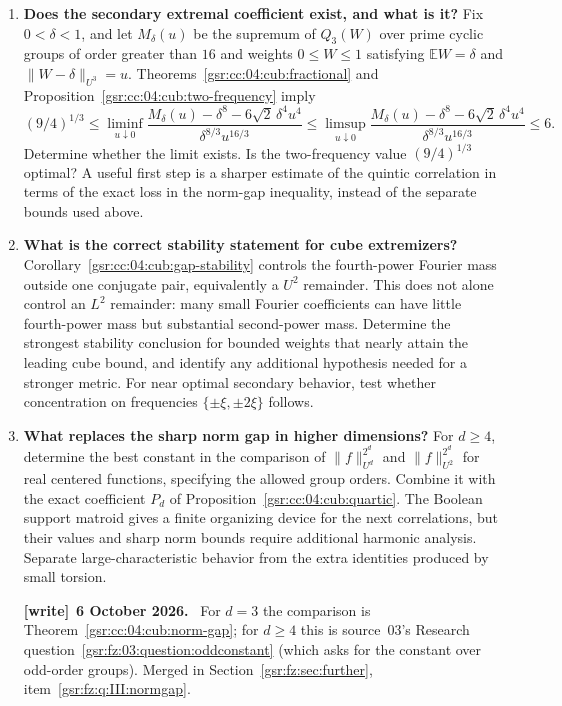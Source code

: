 \documentclass[11pt,letterpaper]{article}
\numberwithin{equation}{section}
\theoremstyle{definition}
\theoremstyle{remark}
\newcommand{\E}{\mathbb E}
\newcommand{\1}{\mathbf 1}
\newenvironment{writenote}[1][]{\par\smallskip\begingroup\small
 \noindent\textbf{[write]}\if\relax\detokenize{#1}\relax\else~\textbf{#1.}\fi\ }%
 {\par\endgroup\smallskip}
\begin{document}
\begin{enumerate}[label=\textbf{Q\arabic*.},leftmargin=2.6em]
\item \textbf{Does the secondary extremal coefficient exist, and what is it?}
Fix \(0<\delta<1\), and let \(M_\delta(u)\) be the supremum of
\(Q_3(W)\) over prime cyclic groups of order greater than \(16\) and weights
\(0\leq W\leq1\) satisfying
\(\E W=\delta\) and \(\|W-\delta\|_{U^3}=u\).
Theorems~\ref{gsr:cc:04:cub:fractional} and
Proposition~\ref{gsr:cc:04:cub:two-frequency} imply
\[
 (9/4)^{1/3}
 \leq
 \liminf_{u\downarrow0}
 \frac{M_\delta(u)-\delta^8-6\sqrt2\,\delta^4u^4}
      {\delta^{8/3}u^{16/3}}
 \leq
 \limsup_{u\downarrow0}
 \frac{M_\delta(u)-\delta^8-6\sqrt2\,\delta^4u^4}
      {\delta^{8/3}u^{16/3}}
 \leq6.
 \tag{Q1}
\]
Determine whether the limit exists.  Is the two-frequency value
\((9/4)^{1/3}\) optimal?  A useful first step is a sharper estimate of the
quintic correlation in terms of the exact loss in the norm-gap inequality,
instead of the separate bounds used above.

\item \textbf{What is the correct stability statement for cube extremizers?}
Corollary~\ref{gsr:cc:04:cub:gap-stability} controls the fourth-power Fourier mass
outside one conjugate pair, equivalently a \(U^2\) remainder.  This does
not alone control an \(L^2\) remainder: many small Fourier coefficients
can have little fourth-power mass but substantial second-power mass.
Determine the strongest stability conclusion for bounded weights that
nearly attain the leading cube bound, and identify any additional
hypothesis needed for a stronger metric.  For near optimal secondary
behavior, test whether concentration on frequencies
\(\{\pm\xi,\pm2\xi\}\) follows.

\item \textbf{What replaces the sharp norm gap in higher dimensions?}
For \(d\geq4\), determine the best constant in the comparison of
\(\|f\|_{U^d}^{2^d}\) and \(\|f\|_{U^2}^{2^d}\) for real centered
functions, specifying the allowed group orders.  Combine it with the
exact coefficient \(P_d\) of Proposition~\ref{gsr:cc:04:cub:quartic}.
The Boolean support matroid gives a finite organizing device for the
next correlations, but their values and sharp norm bounds require
additional harmonic analysis.  Separate large-characteristic behavior
from the extra identities produced by small torsion.
\begin{writenote}[6 October 2026]
For $d=3$ the comparison is Theorem~\ref{gsr:cc:04:cub:norm-gap}; for $d\ge4$ this is source~03's Research question~\ref{gsr:fz:03:question:oddconstant} (which asks for the constant over odd-order groups). Merged in Section~\ref{gsr:fz:sec:further}, item~\ref{gsr:fz:q:III:normgap}.
\end{writenote}
\end{enumerate}
\end{document}
